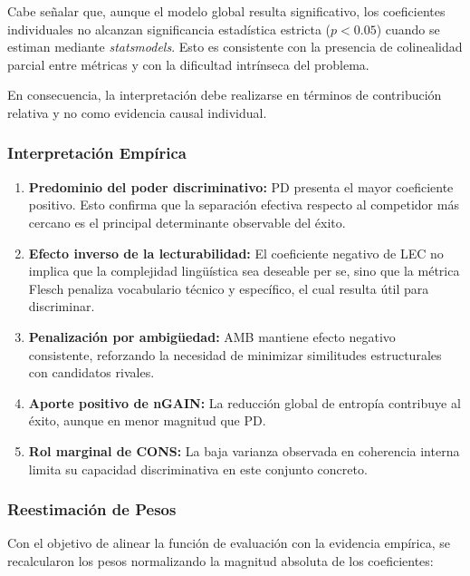 \documentclass[../main.tex]{subfiles}
\begin{document}
Cabe señalar que, aunque el modelo global resulta significativo, los coeficientes individuales no alcanzan significancia estadística estricta ($p<0.05$) cuando se estiman mediante \textit{statsmodels}. Esto es consistente con la presencia de colinealidad parcial entre métricas y con la dificultad intrínseca del problema.

En consecuencia, la interpretación debe realizarse en términos de contribución relativa y no como evidencia causal individual.

\subsubsection{Interpretación Empírica}

\begin{enumerate}

\item \textbf{Predominio del poder discriminativo:} PD presenta el mayor coeficiente positivo. Esto confirma que la separación efectiva respecto al competidor más cercano es el principal determinante observable del éxito.

\item \textbf{Efecto inverso de la lecturabilidad:} El coeficiente negativo de LEC no implica que la complejidad lingüística sea deseable per se, sino que la métrica Flesch penaliza vocabulario técnico y específico, el cual resulta útil para discriminar.

\item \textbf{Penalización por ambigüedad:} AMB mantiene efecto negativo consistente, reforzando la necesidad de minimizar similitudes estructurales con candidatos rivales.

\item \textbf{Aporte positivo de nGAIN:} La reducción global de entropía contribuye al éxito, aunque en menor magnitud que PD.

\item \textbf{Rol marginal de CONS:} La baja varianza observada en coherencia interna limita su capacidad discriminativa en este conjunto concreto.

\end{enumerate}

\subsubsection{Reestimación de Pesos}

Con el objetivo de alinear la función de evaluación con la evidencia empírica, se recalcularon los pesos normalizando la magnitud absoluta de los coeficientes:
\end{document}
